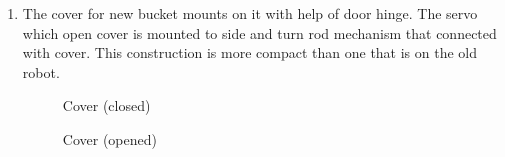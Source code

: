 \begin{enumerate}
   \item The cover for new bucket mounts on it with help of door hinge. The servo which open cover is mounted to side and turn rod mechanism that connected with cover. This construction is more compact than one that is on the old robot.
     \begin{figure}[H]
     	\begin{minipage}[h]{0.49\linewidth}
     		\caption{Cover (closed)}
     	\end{minipage} 
     	\begin{minipage}[h]{0.49\linewidth}
     		\caption{Cover (opened)}
     	\end{minipage}
     \end{figure}
 
 \end{enumerate}	

\fillpage